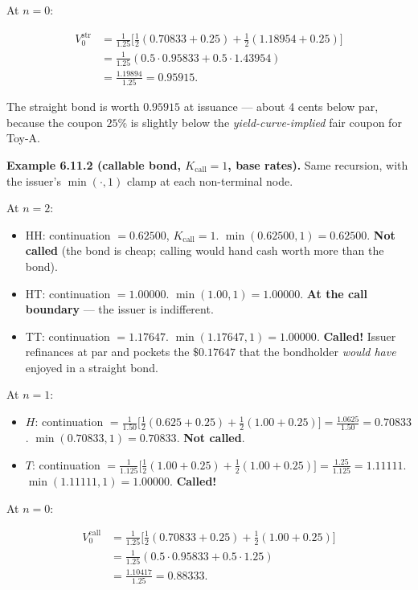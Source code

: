 \documentclass[
  10pt,
  twoside]{book}
\providecommand{\tightlist}{%
  \setlength{\itemsep}{0pt}\setlength{\parskip}{0pt}}
\begin{document}
At \(n = 0\):

\[\begin{aligned}
V_0^{\text{str}} &= \tfrac{1}{1.25}\bigl[\tfrac{1}{2}(0.70833 + 0.25) + \tfrac{1}{2}(1.18954 + 0.25)\bigr] \\
&= \tfrac{1}{1.25}(0.5 \cdot 0.95833 + 0.5 \cdot 1.43954) \\
&= \tfrac{1.19894}{1.25} = \boxed{0.95915}.
\end{aligned}\]

The straight bond is worth \(0.95915\) at issuance --- about 4 cents
below par, because the coupon \(25\%\) is slightly below the
\emph{yield-curve-implied} fair coupon for Toy-A.

\textbf{Example 6.11.2 (callable bond, \(K_{\text{call}} = 1\), base
rates).} Same recursion, with the issuer's \(\min(\cdot, 1)\) clamp at
each non-terminal node.

At \(n = 2\):

\begin{itemize}
\tightlist
\item
  HH: continuation \(= 0.62500\), \(K_{\text{call}} = 1\).
  \(\min(0.62500, 1) = 0.62500\). \textbf{Not called} (the bond is
  cheap; calling would hand cash worth more than the bond).
\item
  HT: continuation \(= 1.00000\). \(\min(1.00, 1) = 1.00000\).
  \textbf{At the call boundary} --- the issuer is indifferent.
\item
  TT: continuation \(= 1.17647\).
  \(\min(1.17647, 1) = \mathbf{1.00000}\). \textbf{Called!} Issuer
  refinances at par and pockets the \(\$0.17647\) that the bondholder
  \emph{would have} enjoyed in a straight bond.
\end{itemize}

At \(n = 1\):

\begin{itemize}
\tightlist
\item
  \(H\): continuation
  \(= \tfrac{1}{1.50}\bigl[\tfrac{1}{2}(0.625 + 0.25) + \tfrac{1}{2}(1.00 + 0.25)\bigr] = \tfrac{1.0625}{1.50} = 0.70833\).
  \(\min(0.70833, 1) = 0.70833\). \textbf{Not called}.
\item
  \(T\): continuation
  \(= \tfrac{1}{1.125}\bigl[\tfrac{1}{2}(1.00 + 0.25) + \tfrac{1}{2}(1.00 + 0.25)\bigr] = \tfrac{1.25}{1.125} = 1.11111\).
  \(\min(1.11111, 1) = \mathbf{1.00000}\). \textbf{Called!}
\end{itemize}

At \(n = 0\):

\[\begin{aligned}
V_0^{\text{call}} &= \tfrac{1}{1.25}\bigl[\tfrac{1}{2}(0.70833 + 0.25) + \tfrac{1}{2}(1.00 + 0.25)\bigr] \\
&= \tfrac{1}{1.25}(0.5 \cdot 0.95833 + 0.5 \cdot 1.25) \\
&= \tfrac{1.10417}{1.25} = \boxed{0.88333}.
\end{aligned}\]
\end{document}
